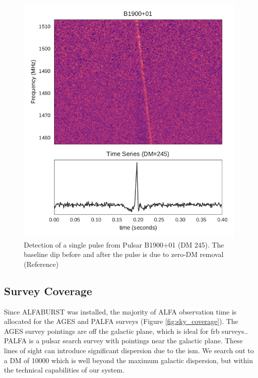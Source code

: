 \documentclass[a4paper,fleqn,usenatbib]{mnras}
\begin{document}
\begin{figure}
    \includegraphics[width=1.0\linewidth]{figures/B1900_01.pdf}
    \caption{Detection of a single pulse from Pulsar B1900+01 (DM
      245). The baseline dip before and after the pulse is due to
      zero-DM removal (Reference) }
    \label{fig:B1900}
\end{figure}



\subsection{Survey Coverage}
\label{sec:survey_coverage}

Since ALFABURST was installed, the majority of ALFA observation time
is allocated for the AGES \citep{2006MNRAS.371.1617A} and PALFA
\citep{2006ApJ...637..446C} surveys (Figure \ref{fig:sky_coverage}).
The AGES survey pointings are off the galactic plane, which is ideal
for \gls{frb} surveys.. PALFA is a pulsar search survey with pointings
near the galactic plane. These lines of sight can introduce
significant dispersion due to the \gls{ism}. We search out to a DM of
10000 which is well beyond the maximum galactic dispersion, but within
the technical capabilities of our system. 
\end{document}
